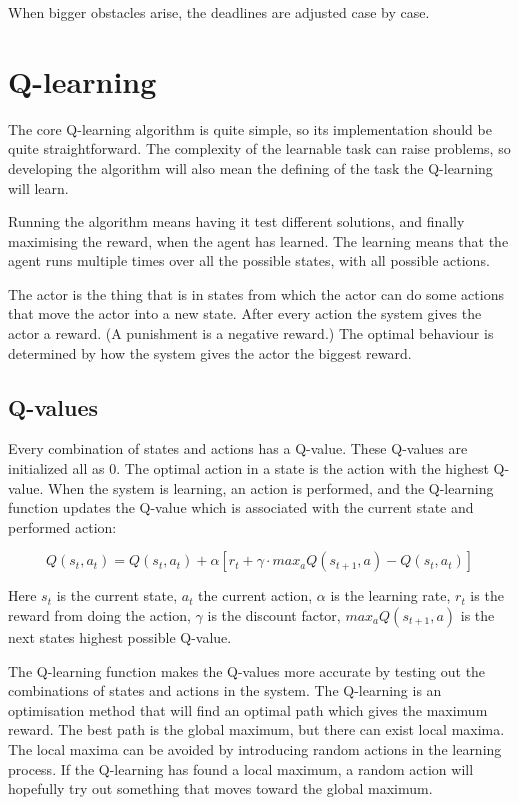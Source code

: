 \documentclass{article}
\begin{document}
When bigger obstacles arise, the deadlines are adjusted case by case.



\section{Q-learning}
The core Q-learning algorithm is quite simple, so its implementation should
be quite straightforward. The complexity of the learnable task can raise
problems, so developing the algorithm will also mean the defining of
the task the Q-learning will learn.

Running the algorithm means having it test different solutions, and finally
maximising the reward, when the agent has learned. The learning means
that the agent runs multiple times over all the possible states,
with all possible actions.

The actor is the thing that is in states from which the actor can do some
actions that move the actor into a new state. After every action the
system gives the actor a reward. (A punishment is a negative reward.)
The optimal behaviour is determined by how the system gives the actor the
biggest reward.


\subsection{Q-values}
Every combination of states and actions has a Q-value. These Q-values are
initialized all as 0. The optimal action in a state is the action with the
highest Q-value. When the system is learning, an action is performed, and the
Q-learning function updates the Q-value which is associated with the current
state and performed action:

\[Q(s_t, a_t) = Q(s_t, a_t) + \alpha [ r_t + \gamma \cdot max_aQ(s_{t+1}, a)
- Q(s_t, a_t) ]\]

Here $s_t$ is the current state, $a_t$ the current action,
$\alpha$ is the learning rate, $r_t$ is the reward from doing the action,
$\gamma$ is the discount factor, $max_aQ(s_{t+1}, a)$ is the next states
highest possible Q-value.

The Q-learning function makes the Q-values more accurate by testing out
the combinations of states and actions in the system. The Q-learning is an
optimisation method that will find an optimal path which gives the maximum
reward. The best path is the global maximum, but there can exist local maxima.
The local maxima can be avoided by introducing random actions in the learning
process. If the Q-learning has found a local maximum, a random action will
hopefully try out something that moves toward the global maximum.
\end{document}
